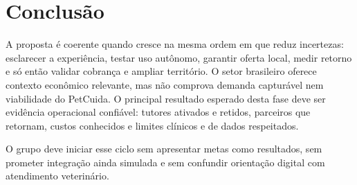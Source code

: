 \documentclass[12pt,a4paper]{article}
\begin{document}
\section{Conclusão}

A proposta é coerente quando cresce na mesma ordem em que reduz incertezas: esclarecer a experiência, testar uso autônomo, garantir oferta local, medir retorno e só então validar cobrança e ampliar território. O setor brasileiro oferece contexto econômico relevante, mas não comprova demanda capturável nem viabilidade do PetCuida. O principal resultado esperado desta fase deve ser evidência operacional confiável: tutores ativados e retidos, parceiros que retornam, custos conhecidos e limites clínicos e de dados respeitados.

O grupo deve iniciar esse ciclo sem apresentar metas como resultados, sem prometer integração ainda simulada e sem confundir orientação digital com atendimento veterinário.

\clearpage
\end{document}
